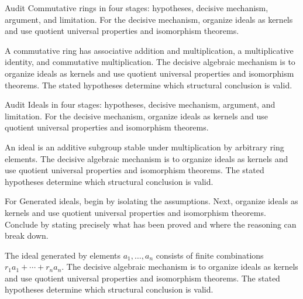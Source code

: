 \begin{problem}\label{prob:v01-problem-01}
Audit Commutative rings in four stages: hypotheses, decisive mechanism, argument, and limitation. For the decisive mechanism, organize ideals as kernels and use quotient universal properties and isomorphism theorems.
\end{problem}
\begin{solution}
A commutative ring has associative addition and multiplication, a multiplicative identity, and commutative multiplication. The decisive algebraic mechanism is to organize ideals as kernels and use quotient universal properties and isomorphism theorems. The stated hypotheses determine which structural conclusion is valid.
\end{solution}

\begin{problem}\label{prob:v01-problem-02}
Audit Ideals in four stages: hypotheses, decisive mechanism, argument, and limitation. For the decisive mechanism, organize ideals as kernels and use quotient universal properties and isomorphism theorems.
\end{problem}
\begin{solution}
An ideal is an additive subgroup stable under multiplication by arbitrary ring elements. The decisive algebraic mechanism is to organize ideals as kernels and use quotient universal properties and isomorphism theorems. The stated hypotheses determine which structural conclusion is valid.
\end{solution}

\begin{problem}\label{prob:v01-problem-03}
For Generated ideals, begin by isolating the assumptions. Next, organize ideals as kernels and use quotient universal properties and isomorphism theorems. Conclude by stating precisely what has been proved and where the reasoning can break down.
\end{problem}
\begin{solution}
The ideal generated by elements $a_1,\dots,a_n$ consists of finite combinations $r_1a_1+\cdots+r_na_n$. The decisive algebraic mechanism is to organize ideals as kernels and use quotient universal properties and isomorphism theorems. The stated hypotheses determine which structural conclusion is valid.
\end{solution}

